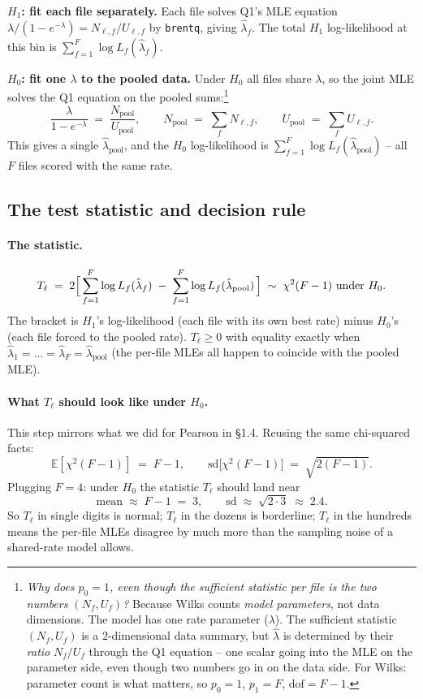 \documentclass[11pt]{article}
\newcommand{\E}{\mathbb{E}}
\begin{document}
\textbf{$H_1$: fit each file separately.} Each file solves Q1's MLE equation
$\lambda/(1 - e^{-\lambda}) = N_{\ell,f}/U_{\ell,f}$ by \texttt{brentq},
giving $\hat\lambda_f$. The total $H_1$ log-likelihood at this bin is
$\sum_{f=1}^{F} \log L_f(\hat\lambda_f)$.

\textbf{$H_0$: fit one $\lambda$ to the pooled data.} Under $H_0$ all files
share $\lambda$, so the joint MLE solves the Q1 equation on the pooled
sums:\footnote{\emph{Why does $p_0 = 1$, even though the sufficient
statistic per file is the two numbers $(N_f, U_f)$?} Because Wilks counts
\emph{model parameters}, not data dimensions. The model has one rate
parameter ($\lambda$). The sufficient statistic $(N_f, U_f)$ is a
2-dimensional data summary, but $\hat\lambda$ is determined by their
\emph{ratio} $N_f/U_f$ through the Q1 equation -- one scalar going into the
MLE on the parameter side, even though two numbers go in on the data side.
For Wilks: parameter count is what matters, so $p_0 = 1$, $p_1 = F$,
$\mathrm{dof} = F - 1$.}
\[
   \frac{\lambda}{1 - e^{-\lambda}} \;=\; \frac{N_{\text{pool}}}{U_{\text{pool}}},
   \qquad N_{\text{pool}} \;=\; \sum_f N_{\ell,f},
   \qquad U_{\text{pool}} \;=\; \sum_f U_{\ell,f}.
\]
This gives a single $\hat\lambda_{\text{pool}}$, and the $H_0$
log-likelihood is $\sum_{f=1}^{F} \log L_f(\hat\lambda_{\text{pool}})$ --
all $F$ files scored with the same rate.

\subsection{The test statistic and decision rule}

\paragraph{The statistic.}
\[
   T_\ell \;=\; 2\Bigl[\, \sum_{f=1}^{F} \log L_f(\hat\lambda_f)
                       \;-\; \sum_{f=1}^{F} \log L_f(\hat\lambda_{\text{pool}}) \,\Bigr]
        \;\sim\; \chi^{2}(F - 1) \text{ under } H_0.
\]
The bracket is $H_1$'s log-likelihood (each file with its own best rate)
minus $H_0$'s (each file forced to the pooled rate). $T_\ell \geq 0$ with
equality exactly when $\hat\lambda_1 = \dots = \hat\lambda_F =
\hat\lambda_{\text{pool}}$ (the per-file MLEs all happen to coincide with
the pooled MLE).

\paragraph{What $T_\ell$ should look like under $H_0$.}
This step mirrors what we did for Pearson in \S 1.4. Reusing the same
chi-squared facts:
\[
   \E[\chi^{2}(F-1)] \;=\; F - 1,
   \qquad
   \mathrm{sd}\bigl[\chi^{2}(F-1)\bigr] \;=\; \sqrt{2(F - 1)}.
\]
Plugging $F = 4$: under $H_0$ the statistic $T_\ell$ should land near
\[
   \mathrm{mean} \;\approx\; F - 1 \;=\; 3,
   \qquad
   \mathrm{sd} \;\approx\; \sqrt{2 \cdot 3} \;\approx\; 2.4.
\]
So $T_\ell$ in single digits is normal; $T_\ell$ in the dozens is
borderline; $T_\ell$ in the hundreds means the per-file MLEs disagree by
much more than the sampling noise of a shared-rate model allows.
\end{document}
